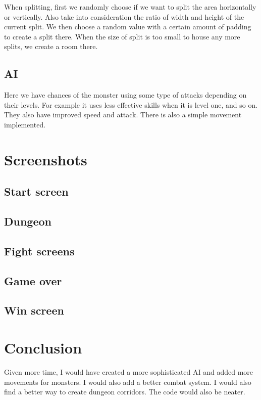 \documentclass[11pt]{article}
\begin{document}
When splitting, first we randomly choose if we want to split the area horizontally or vertically. Also take into consideration the ratio of width and height of the current split. We then choose a random value with a certain amount of padding to create a split there. When the size of split is too small to house any more splits, we create a room there.
\subsection{AI}
\label{sec:orgaaa61ad}
Here we have chances of the monster using some type of attacks depending on their levels. For example it uses less effective skills when it is level one, and so on. They also have improved speed and attack. There is also a simple movement implemented.

\section{Screenshots}
\label{sec:orga686858}
\subsection{Start screen}
\label{sec:org7715596}
\subsection{Dungeon}
\label{sec:org8f23c91}
\subsection{Fight screens}
\label{sec:orgc56b31e}
\subsection{Game over}
\label{sec:orgf36c511}
\subsection{Win screen}
\label{sec:orgd4f2244}

\section{Conclusion}
\label{sec:org6f5644d}
Given more time, I would have created a more sophisticated AI and added more movements for monsters. I would also add a better combat system. I would also find a better way to create dungeon corridors. The code would also be neater.
\end{document}
